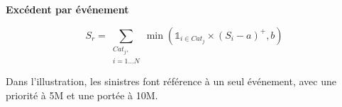 \begin{f}
\textbf{Excédent par événement}
	
	\[
	S_r= \sum_{\begin{array}{c}
			Cat_j,\\ i=1\ldots N
	\end{array}} \min\left( \mathds{1}_{i\in Cat_j}\times \left( S_i-a\right)^+,b\right)  
	\]
	
	Dans l'illustration, les sinistres font référence à un seul événement, avec une priorité à 5M\EUR{}  et une portée à 10M\EUR{}.
	


\end{f}
